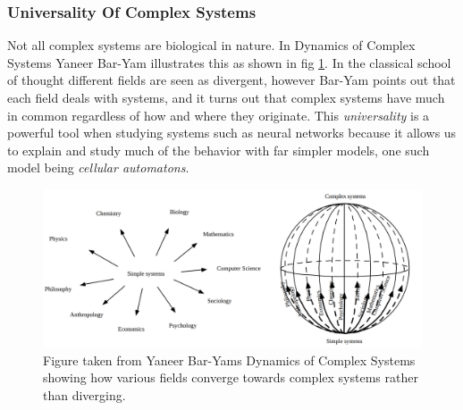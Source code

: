 \subsubsection{Universality Of Complex Systems}
Not all complex systems are biological in nature.
In Dynamics of Complex Systems Yaneer Bar-Yam illustrates this as shown in fig
\ref{figCX}.
In the classical school of thought different fields are seen as divergent,
however Bar-Yam points out that each field deals with systems, and it turns out
that complex systems have much in common regardless of how and where they
originate.
This \emph{universality} is a powerful tool when studying systems such as neural
networks because it allows us to explain and study much of the behavior with far
simpler models, one such model being \emph{cellular automatons}.
\begin{figure}[h!]
  \centering
  \includegraphics[width=1\textwidth]{fig/BarYamCX.png}
  \caption{
    Figure taken from Yaneer Bar-Yams Dynamics of Complex Systems showing how
    various fields converge towards complex systems rather than diverging.
  }
  \label{figCX}
\end{figure}
